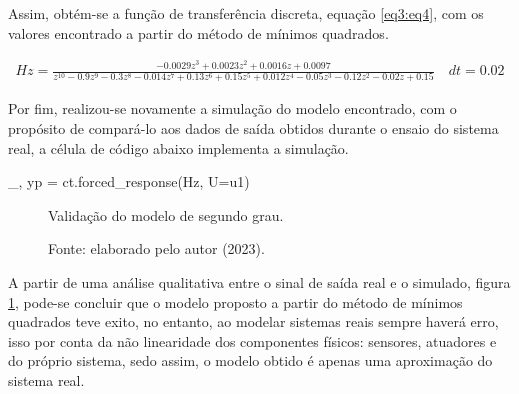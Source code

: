 Assim, obtém-se a função de transferência discreta, equação \ref{eq3:eq4}, com os valores encontrado a partir do método de mínimos quadrados.

\begin{align}
Hz = \frac{-0.0029 z^3 + 0.0023z^2 + 0.0016 z + 0.0097}{z^{10} - 0.9 z^9 - 0.3 z^8 - 0.014 z^7 + 0.13 z^6 + 0.15 z^5 + 0.012 z^4 - 0.05 z^3 - 0.12 z^2 - 0.02 z + 0.15}\quad dt = 0.02\label{eq3:eq4}
\end{align}

Por fim, realizou-se novamente a simulação do modelo encontrado, com o propósito de compará-lo aos dados de saída obtidos durante o ensaio do sistema real, a célula de código abaixo implementa a simulação.

\vspace{0.5cm}

\begin{python}
_, yp = ct.forced_response(Hz, U=u1)
\end{python}


\begin{figure}[!h]
	\centering
	\caption{Validação do modelo de segundo grau.}
	\caption*{Fonte: elaborado pelo autor (2023).}
	\label{fig3:image_22}
\end{figure}


A partir de uma análise qualitativa entre o sinal de saída real e o simulado, figura \ref{fig3:image_22}, pode-se concluir que o modelo proposto a partir do método de mínimos quadrados teve exito, no entanto, ao modelar sistemas reais sempre haverá erro, isso por conta da não linearidade dos componentes físicos: sensores, atuadores e do próprio sistema, sedo assim, o modelo obtido é apenas uma aproximação do sistema real. %


